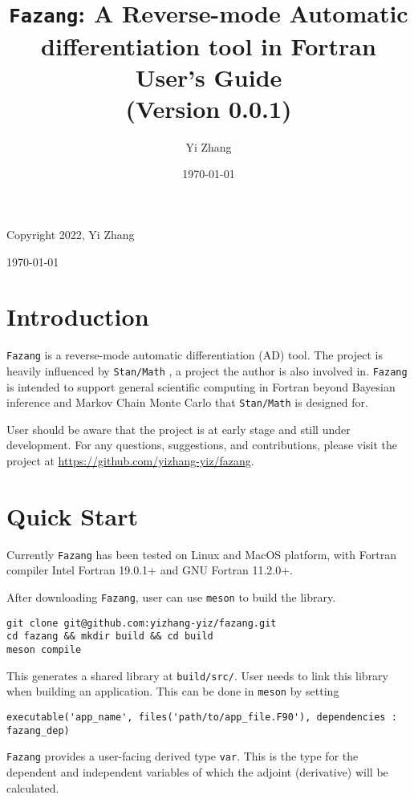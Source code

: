 \documentclass[12pt, reqno, oneside]{amsbook}
\author{Yi Zhang}
\date{\today}
\title{\texttt{Fazang}: A Reverse-mode Automatic differentiation tool in Fortran\\\medskip
\large User's Guide \\  (Version 0.0.1)}
\begin{document}
\begin{titlepage}
\maketitle
Copyright 2022, Yi Zhang
\newline
\newline
\newline

\today
\tableofcontents
\end{titlepage}

\chapter{Introduction}
\label{sec:org0ab160a}
\texttt{Fazang} is a reverse-mode automatic differentiation (AD) tool. The
project is heavily influenced by \texttt{Stan/Math} \cite{Carpenter:2015}, a project the author
is also involved in. \texttt{Fazang} is intended to support general scientific
computing in Fortran beyond Bayesian inference and Markov Chain
Monte Carlo that \texttt{Stan/Math} is designed for. 

User should be aware that the project is at early stage and still
under development. For any questions, suggestions, and
contributions, please visit the project at \url{https://github.com/yizhang-yiz/fazang}.
\chapter{Quick Start}
\label{sec:orga38fb73}
Currently \texttt{Fazang} has been tested on Linux and MacOS platform, with
Fortran compiler Intel Fortran 19.0.1+ and GNU Fortran 11.2.0+.

After downloading \texttt{Fazang}, user can use \texttt{meson} to build the library.
\begin{verbatim}
git clone git@github.com:yizhang-yiz/fazang.git
cd fazang && mkdir build && cd build
meson compile
\end{verbatim}
This generates a shared library at \texttt{build/src/}. User needs to link
this library when building an application. This can be done in
\texttt{meson} by setting
\begin{verbatim}
executable('app_name', files('path/to/app_file.F90'), dependencies : fazang_dep)
\end{verbatim}

\texttt{Fazang} provides a user-facing derived type \texttt{var}. This is the
type for the dependent and independent variables of which the
adjoint (derivative) will be calculated.
\end{document}

